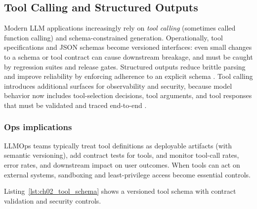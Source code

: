 \subsection{Tool Calling and Structured Outputs}
\label{sec:ch2-tool-calling}
Modern LLM applications increasingly rely on \emph{tool calling} (sometimes called function calling)
and schema-constrained generation. Operationally, tool specifications and JSON schemas become
versioned interfaces: even small changes to a schema or tool contract can cause downstream breakage,
and must be caught by regression suites and release gates. Structured outputs reduce brittle parsing
and improve reliability by enforcing adherence to an explicit schema \cite{openai_structured_outputs_docs,openai_structured_outputs_blog}.
Tool calling introduces additional surfaces for observability and security, because model behavior now
includes tool-selection decisions, tool arguments, and tool responses that must be validated and traced
end-to-end \cite{openai_function_calling_docs}.

\subsubsection{Ops implications}
LLMOps teams typically treat tool definitions as deployable artifacts (with semantic versioning), add
contract tests for tools, and monitor tool-call rates, error rates, and downstream impact on user outcomes.
When tools can act on external systems, sandboxing and least-privilege access become essential controls.

Listing~\ref{lst:ch02_tool_schema} shows a versioned tool schema with contract validation and security controls.

